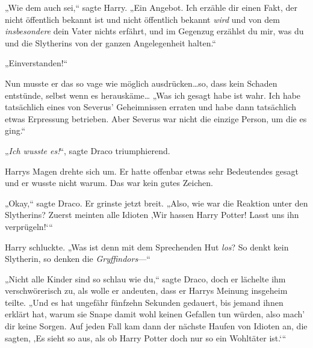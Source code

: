 „Wie dem auch sei,“ sagte Harry. „Ein Angebot. Ich erzähle dir einen Fakt, der nicht öffentlich bekannt ist und nicht öffentlich bekannt \emph{wird} und von dem \emph{insbesondere} dein Vater nichts erfährt, und im Gegenzug erzählst du mir, was du und die Slytherins von der ganzen Angelegenheit halten.“

„Einverstanden!“

Nun musste er das so vage wie möglich ausdrücken…so, dass kein Schaden entstünde, selbst wenn es herauskäme… „Was ich gesagt habe ist wahr. Ich habe tatsächlich eines von Severus’ Geheimnissen erraten und habe dann tatsächlich etwas Erpressung betrieben. Aber Severus war nicht die einzige Person, um die es ging.“

„\emph{Ich wusste es!}“, sagte Draco triumphierend.

Harrys Magen drehte sich um. Er hatte offenbar etwas sehr Bedeutendes gesagt und er wusste nicht warum. Das war kein gutes Zeichen.

„Okay,“ sagte Draco. Er grinste jetzt breit. „Also, wie war die Reaktion unter den Slytherins? Zuerst meinten alle Idioten ‚Wir hassen Harry Potter! Lasst uns ihn verprügeln!‘“

Harry schluckte. „Was ist denn mit dem Sprechenden Hut \emph{los}? So denkt kein Slytherin, so denken die \emph{Gryffindors}—“

„Nicht alle Kinder sind so schlau wie du,“ sagte Draco, doch er lächelte ihm verschwörerisch zu, als wolle er andeuten, dass er Harrys Meinung insgeheim teilte. „Und es hat ungefähr fünfzehn Sekunden gedauert, bis jemand ihnen erklärt hat, warum sie Snape damit wohl keinen Gefallen tun würden, also mach’ dir keine Sorgen. Auf jeden Fall kam dann der nächste Haufen von Idioten an, die sagten, ‚Es sieht so aus, als ob Harry Potter doch nur so ein Wohltäter ist.‘“

